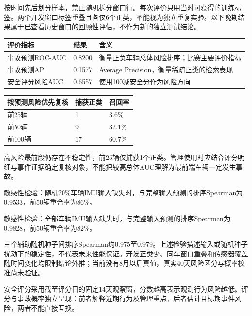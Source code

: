 \documentclass[UTF8,10pt]{ctexart}
\newcommand{\hdr}[1]{\par\vspace{0.4em}{\large\heiti\color{heading}#1}\par\vspace{0.4em}}
\newcommand{\secpage}[1]{\clearpage\hdr{#1}}
\newcommand{\thead}[1]{\textbf{\color{heading}#1}}
\begin{document}
按时间先后划分样本，禁止随机拆分窗口行。每次评价只用当时可获得的训练标签。两个开发窗口标签重叠且各仅6个正类，不能视为独立重复实验。以下晚期结果属于已查看历史窗口的回顾性评估，不作为新的独立测试结论。

\begin{center}\small
{}
\begin{tabularx}{\textwidth}{p{3.6cm} p{2.2cm} Y}
\thead{评价指标} & \thead{结果} & \thead{含义} \\
\hline
事故预测ROC-AUC & 0.8200 & 衡量正负车辆总体风险排序；比赛主要评价指标 \\
\hline
事故预测AP & 0.1577 & Average Precision，衡量稀疏正类的检索表现 \\
\hline
安全评分风险AUC & 0.6557 & 使用100减安全分作为风险方向 \\
\hline
\end{tabularx}
\end{center}

\begin{center}\small
{}
\begin{tabularx}{\textwidth}{p{4.4cm} p{2.4cm} p{2.4cm}}
\rowcolor{thead}\thead{按预测风险优先复核} & \thead{捕获正类} & \thead{召回率} \\
\hline
前25辆 & 1 & 3.6\% \\
\hline
前50辆 & 9 & 32.1\% \\
\hline
前100辆 & 17 & 60.7\% \\
\hline
\end{tabularx}
\end{center}

高风险最前段仍存在不稳定性，前25辆仅捕获1个正类。管理使用时应结合评分明细与事件证据确定复核对象，不能把较高总体AUC理解为最前端车辆一定发生事故。

{敏感性检验：随机20\%车辆IMU输入缺失时，与完整输入预测的排序Spearman为0.9533，前50辆重合率为86\%。}

{敏感性检验：全部车辆IMU输入缺失时，与完整输入预测的排序Spearman为0.9828，前50辆重合率为82\%。}

{三个辅助随机种子间排序Spearman约0.975至0.979。上述检验描述输入或随机种子扰动下的稳定性，不代表未来性能保证。开发正类少、同车窗口重叠和传感器覆盖随时间变化均限制结论外推；当前没有8月以后真值，真实40天风险区分与概率校准尚未验证。}

\secpage{04\;|\;安全评分公式与维度权重}

安全评分采用截至评分日的固定14天观察窗，分数越高表示观测行为风险越低。评分与事故概率独立呈现：前者解释近期行为及管理重点，后者估计目标期事件风险，两者不能直接互换。
\end{document}
